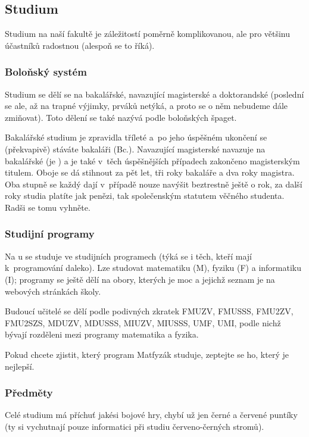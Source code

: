 \subsection{Studium}

Studium na naší fakultě je záležitostí poměrně komplikovanou, ale
pro většinu účastníků radostnou (alespoň se to říká). 

\subsubsection{Boloňský systém}

Studium se dělí se na
bakalářské, navazující magisterské a doktorandské (poslední se
ale, až na trapné výjimky, prváků netýká, a proto se o něm
nebudeme dále zmiňovat). Toto dělení se také nazývá  podle boloňských špaget.

Bakalářské studium je zpravidla tříleté
a~po jeho úspěšném ukončení se (pře\-kva\-pi\-vě) stáváte bakaláři
(Bc.). Navazující magisterské navazuje na bakalářské (je
) a je také v~těch úspěšnějších případech zakončeno
magisterským titulem. Oboje se dá stihnout za pět let, tři roky bakaláře a dva roky magistra. Oba stupně se každý dají v~případě nouze navýšit beztrestně ještě o rok, za další roky studia platíte jak penězi, tak společenským statutem věčného studenta. Radši se tomu vyhněte.


\subsubsection{Studijní programy}

Na \mfz{}u se studuje ve studijních programech (týká se i těch,
kteří mají k~programování daleko). Lze studovat matematiku (M),
fyziku (F) a informatiku (I); programy se ještě dělí na obory, kterých je moc a jejichž seznam je na webových stránkách školy.

Budoucí učitelé se dělí podle podivných zkratek FMUZV, FMUSSS, FMU2ZV, FMU2SZS, MDUZV, MDUSSS, MIUZV, MIUSSS, UMF, UMI, podle nichž bývají rozděleni mezi programy matematika a fyzika.

Pokud chcete zjistit, který program Matfyzák studuje, zeptejte se ho, který je nejlepší.

\subsubsection{Předměty}
Celé studium má příchuť jakési bojové hry, chybí už
jen černé a červené puntíky (ty si vychutnají pouze informatici
při studiu červeno-černých stromů).

